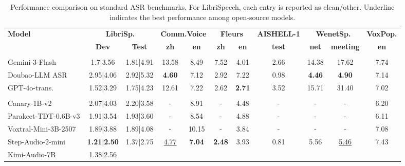 \documentclass{article}
\begin{document}
\begin{table}[t]


\vspace{2mm}

\caption{Performance comparison on standard ASR benchmarks. For LibriSpeech, each entry is reported as clean/other. Underline indicates the best performance among open-source models.}
\vspace{-2mm}
\label{tab:main_standard}
\setlength{\tabcolsep}{3.9pt}
\begin{tabular}{lcccccccccc}
\toprule
\textbf{Model} &
\multicolumn{2}{c}{\textbf{LibriSp.}} &
\multicolumn{2}{c}{\textbf{Comm.Voice}} &
\multicolumn{2}{c}{\textbf{Fleurs}} &
\textbf{AISHELL-1} &
\multicolumn{2}{c}{\textbf{WenetSp.}} &
\textbf{VoxPop.} \\
\cmidrule(lr){2-3}
\cmidrule(lr){4-5}
\cmidrule(lr){6-7}
\cmidrule(lr){9-10}
&
\textbf{Dev} &
\textbf{Test} &
\textbf{zh} &
\textbf{en} &
\textbf{zh} &
\textbf{en} &
\textbf{test} &
\textbf{net} &
\textbf{meeting} &
\textbf{en} \\
\midrule
\rowcolor{headerblue}
\multicolumn{11}{l}{\textit{Closed-source models}} \\
Gemini-3-Flash &
1.7|3.56 &
1.81|4.91 &
13.58 &
8.49 &
7.52 &
4.01 &
2.66 &
14.38 &
17.62 &
7.74 \\
Doubao-LLM ASR &
2.95|4.06 &
2.92|5.32 &
\textbf{4.60} &
7.12 &
2.92 &
7.22 &
0.98 &
\textbf{4.46} &
\textbf{4.90} &
7.14 \\
GPT-4o-trans. &
1.52|3.29 &
1.75|4.23 &
12.61 &
7.22 &
2.62 &
\textbf{2.71} &
3.52 &
15.71 &
31.40 &
7.02 \\
\rowcolor{headerblue}
\multicolumn{11}{l}{\textit{Open-source models}} \\
Canary-1B-v2 &
2.07|4.03 &
2.20|3.58 &
- &
8.91 &
- &
4.48 &
- &
- &
- &
6.20 \\
Parakeet-TDT-0.6B-v3 &
1.91|3.54 &
1.93|3.60 &
- &
8.54 &
- &
4.88 &
- &
- &
- &
6.11 \\
Voxtral-Mini-3B-2507 &
1.89|3.88 &
1.89|4.08 &
- &
10.15 &
- &
3.84 &
- &
- &
- &
7.08 \\
Step-Audio-2-mini &
\textbf{1.21}|\textbf{2.50} &
1.37|2.75 &
\underline{4.77} &
\textbf{7.04} &
\textbf{2.48} &
3.93 &
0.81 &
5.56 &
\underline{5.46} &
7.43 \\
Kimi-Audio-7B &
1.38|2.56 &

\end{tabular}
\end{table}
\end{document}
